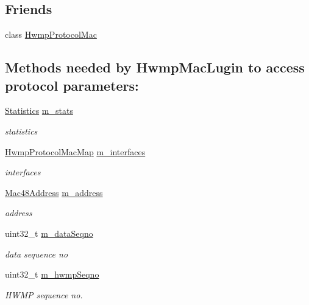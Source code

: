 \subsection*{Friends}
\begin{DoxyCompactItemize}
\item 
class \hyperlink{classns3_1_1dot11s_1_1HwmpProtocol_a56ef929e9b9723614942cd480b041c27}{Hwmp\+Protocol\+Mac}
\end{DoxyCompactItemize}
\subsection*{Methods needed by Hwmp\+Mac\+Lugin to access protocol parameters\+:}
\begin{DoxyCompactItemize}
\item 
\hyperlink{structns3_1_1dot11s_1_1HwmpProtocol_1_1Statistics}{Statistics} \hyperlink{classns3_1_1dot11s_1_1HwmpProtocol_a478a13e7ec9ca167a5b13b38237d17ae}{m\+\_\+stats}
\begin{DoxyCompactList}\small\item\em statistics \end{DoxyCompactList}\item 
\hyperlink{classns3_1_1dot11s_1_1HwmpProtocol_affcc6c0fdecdf3c6160d356e86aeb8ed}{Hwmp\+Protocol\+Mac\+Map} \hyperlink{classns3_1_1dot11s_1_1HwmpProtocol_ae2cee085d1d2b9d32b509b710c0b4511}{m\+\_\+interfaces}
\begin{DoxyCompactList}\small\item\em interfaces \end{DoxyCompactList}\item 
\hyperlink{classns3_1_1Mac48Address}{Mac48\+Address} \hyperlink{classns3_1_1dot11s_1_1HwmpProtocol_abe24aa7305ec320810e4a0343ca9b25a}{m\+\_\+address}
\begin{DoxyCompactList}\small\item\em address \end{DoxyCompactList}\item 
uint32\+\_\+t \hyperlink{classns3_1_1dot11s_1_1HwmpProtocol_a3b6ff76d8b7440a1d56234404ea0935a}{m\+\_\+data\+Seqno}
\begin{DoxyCompactList}\small\item\em data sequence no \end{DoxyCompactList}\item 
uint32\+\_\+t \hyperlink{classns3_1_1dot11s_1_1HwmpProtocol_a4cd2c80d65cf41a84208cba9d62b87eb}{m\+\_\+hwmp\+Seqno}
\begin{DoxyCompactList}\small\item\em H\+W\+MP sequence no. \end{DoxyCompactList}\item 

\end{DoxyCompactItemize}
